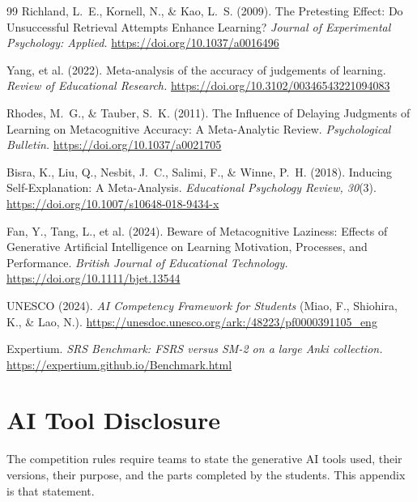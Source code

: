 \documentclass[11pt,a4paper]{article}
\begin{document}
\begin{thebibliography}{99}
 Richland, L.~E., Kornell, N., \& Kao, L.~S. (2009). The Pretesting
Effect: Do Unsuccessful Retrieval Attempts Enhance Learning? \emph{Journal of Experimental
Psychology: Applied.} \url{https://doi.org/10.1037/a0016496}

 Yang, et al. (2022). Meta-analysis of the accuracy of judgements of
learning. \emph{Review of Educational Research.}
\url{https://doi.org/10.3102/00346543221094083}

 Rhodes, M.~G., \& Tauber, S.~K. (2011). The Influence of Delaying
Judgments of Learning on Metacognitive Accuracy: A Meta-Analytic Review. \emph{Psychological
Bulletin.} \url{https://doi.org/10.1037/a0021705}

 Bisra, K., Liu, Q., Nesbit, J.~C., Salimi, F., \& Winne, P.~H. (2018).
Inducing Self-Explanation: A Meta-Analysis. \emph{Educational Psychology Review, 30}(3).
\url{https://doi.org/10.1007/s10648-018-9434-x}

 Fan, Y., Tang, L., et al. (2024). Beware of Metacognitive Laziness: Effects
of Generative Artificial Intelligence on Learning Motivation, Processes, and Performance.
\emph{British Journal of Educational Technology.}
\url{https://doi.org/10.1111/bjet.13544}

 UNESCO (2024). \emph{AI Competency Framework for Students} (Miao, F.,
Shiohira, K., \& Lao, N.). \url{https://unesdoc.unesco.org/ark:/48223/pf0000391105_eng}

 Expertium. \emph{SRS Benchmark: FSRS versus SM-2 on a large Anki
collection.} \url{https://expertium.github.io/Benchmark.html}

\end{thebibliography}

\appendix
\section{AI Tool Disclosure}

The competition rules require teams to state the generative AI tools used, their versions,
their purpose, and the parts completed by the students. This appendix is that statement.
\end{document}

